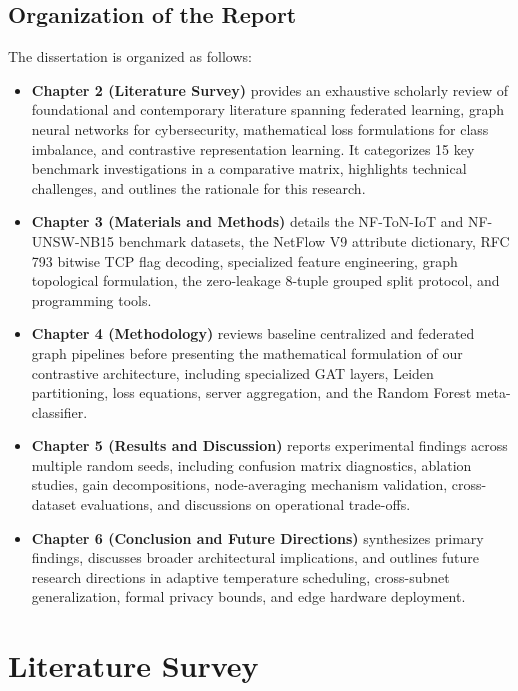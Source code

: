 \documentclass[12pt,a4paper]{report}
\begin{document}
\section{Organization of the Report}
\label{sec:organization}

The dissertation is organized as follows:
\begin{itemize}
    \item \textbf{Chapter 2 (Literature Survey)} provides an exhaustive scholarly review of foundational and contemporary literature spanning federated learning, graph neural networks for cybersecurity, mathematical loss formulations for class imbalance, and contrastive representation learning. It categorizes 15 key benchmark investigations in a comparative matrix, highlights technical challenges, and outlines the rationale for this research.
    \item \textbf{Chapter 3 (Materials and Methods)} details the NF-ToN-IoT and NF-UNSW-NB15 benchmark datasets, the NetFlow V9 attribute dictionary, RFC 793 bitwise TCP flag decoding, specialized feature engineering, graph topological formulation, the zero-leakage 8-tuple grouped split protocol, and programming tools.
    \item \textbf{Chapter 4 (Methodology)} reviews baseline centralized and federated graph pipelines before presenting the mathematical formulation of our contrastive architecture, including specialized GAT layers, Leiden partitioning, loss equations, server aggregation, and the Random Forest meta-classifier.
    \item \textbf{Chapter 5 (Results and Discussion)} reports experimental findings across multiple random seeds, including confusion matrix diagnostics, ablation studies, gain decompositions, node-averaging mechanism validation, cross-dataset evaluations, and discussions on operational trade-offs.
    \item \textbf{Chapter 6 (Conclusion and Future Directions)} synthesizes primary findings, discusses broader architectural implications, and outlines future research directions in adaptive temperature scheduling, cross-subnet generalization, formal privacy bounds, and edge hardware deployment.
\end{itemize}


\chapter{Literature Survey}\label{ch:literature}
\label{chap:lit_survey}
\end{document}

